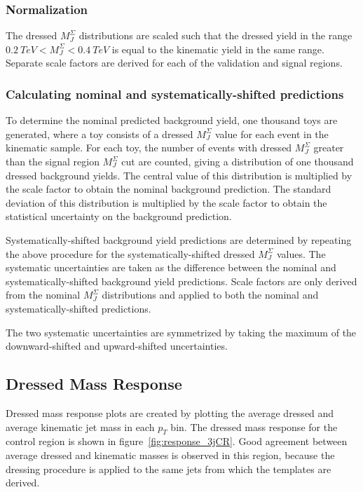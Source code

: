 \subsubsection{Normalization}
The dressed $M_{J}^{\Sigma}$ distributions are scaled such that the dressed yield in the range  $0.2~TeV < M_{J}^{\Sigma} < 0.4~TeV$ is equal to the kinematic yield in the same range.
Separate scale factors are derived for each of the validation and signal regions.

\subsubsection{Calculating nominal and systematically-shifted predictions}
To determine the nominal predicted background yield, one thousand toys are generated,
where a toy consists of a dressed $M_{J}^{\Sigma}$ value for each event in the kinematic sample.
For each toy, the number of events with dressed $M_{J}^{\Sigma}$ greater than the signal region $M_{J}^{\Sigma}$ cut are counted,
giving a distribution of one thousand dressed background yields.
The central value of this distribution is multiplied by the scale factor to obtain the nominal background prediction.
The standard deviation of this distribution is multiplied by the scale factor to obtain the statistical uncertainty on the background prediction.

Systematically-shifted background yield predictions are determined by repeating the above procedure for the systematically-shifted dressed $M_{J}^{\Sigma}$ values.
The systematic uncertainties are taken as the difference between the nominal and systematically-shifted background yield predictions.
Scale factors are only derived from the nominal $M_{J}^{\Sigma}$ distributions and applied to both the nominal and systematically-shifted predictions.

The two systematic uncertainties are symmetrized by taking the maximum of the \linebreak downward-shifted and upward-shifted uncertainties.

\subsection{Dressed Mass Response} \label{subsec:response}
Dressed mass response plots are created by plotting the average dressed and average kinematic jet mass in each $p_T$ bin.
The dressed mass response for the control region is shown in figure~\ref{fig:response_3jCR}.
Good agreement between average dressed and kinematic masses is observed in this region,
because the dressing procedure is applied to the same jets from which the templates are derived.


